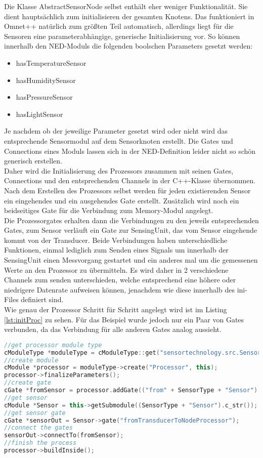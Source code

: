 Die Klasse AbstractSensorNode selbst enthält eher weniger Funktionalität. Sie dient hauptsächlich zum initialisieren der gesamten Knotens. Das funktioniert in Omnet++ natürlich zum größten Teil automatisch, allerdings liegt für die Sensoren eine parameterabhängige, generische Initialisierung vor. So können innerhalb den NED-Moduls die folgenden boolschen Parameters gesetzt werden:
\begin{itemize}
\item hasTemperatureSensor
\item hasHumiditySensor
\item hasPressureSensor
\item hasLightSensor
\end{itemize}
Je nachdem ob der jeweilige Parameter gesetzt wird oder nicht wird das entsprechende Sensormodul auf dem Sensorknoten erstellt. Die Gates und Connections eines Moduls lassen sich in der NED-Definition leider nicht so schön generisch erstellen.\\
Daher wird die Initialisierung des Prozessors zusammen mit seinen Gates, Connections und den entsprechenden Channels in der C++-Klasse übernommen. Nach dem Erstellen des Prozessors selbst werden für jeden existierenden Sensor ein eingehendes und ein ausgehendes Gate erstellt. Zusätzlich wird noch ein beidseitiges Gate für die Verbindung zum Memory-Modul angelegt.\\
Die Prozessorgates erhalten dann die Verbindungen zu den jeweils entsprechenden Gates, zum Sensor verläuft ein Gate zur SensingUnit, das vom Sensor eingehende kommt von der Transducer. Beide Verbindungen haben unterschiedliche Funktionen, einmal lediglich zum Senden eines Signals um innerhalb der SensingUnit einen Messvorgang gestartet und ein anderes mal um die gemessenen Werte an den Prozessor zu übermitteln. Es wird daher in 2 verschiedene Channels zum senden unterschieden, welche entsprechend eine höhere oder niedrigere Datenrate aufweisen können, jenachdem wie diese innerhalb des ini-Files definiert sind.\\
Wie genau der Prozessor Schritt für Schritt angelegt wird ist im Listing \ref{lst:initProc} zu sehen. Für das Beispiel wurde jedoch nur ein Paar von Gates verbunden, da das Verbindung für alle anderen Gates analog aussieht.

\begin{lstlisting}[language=C++, label=lst:initProc, caption=teilweise Initialisierung des Prozessors]
//get processor module type
cModuleType *moduleType = cModuleType::get("sensortechnology.src.SensorNode.Processor.Processor");
//create module
cModule *processor = moduleType->create("Processor", this);
processor->finalizeParameters();
//create gate
cGate *fromSensor = processor.addGate(("from" + SensorType + "Sensor").c_str(), cGate::INPUT);
//get sensor
cModule *Sensor = this->getSubmodule((SensorType + "Sensor").c_str());
//get sensor gate
cGate *sensorOut = Sensor->gate("fromTransducerToNodeProcessor");    
//connect the gates
sensorOut->connectTo(fromSensor);    
//finish the process
processor->buildInside();
\end{lstlisting}

